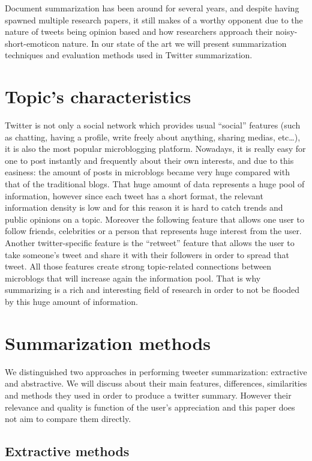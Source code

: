 \documentclass[runningheads]{llncs}
\begin{document}
Document summarization has been around for several years, and despite having
spawned multiple research papers, it still makes of a worthy opponent due to
the nature of tweets being opinion based and how researchers approach their
noisy-short-emoticon nature. In our state of the art we will present
summarization techniques and evaluation methods used in Twitter summarization.

\section{Topic's characteristics}

Twitter is not only a social network which provides usual ``social'' features
(such as chatting, having a profile, write freely about anything, sharing
medias, etc…), it is also the most popular microblogging platform. Nowadays, it is
really easy for one to post instantly and frequently about their own interests,
and due to this easiness: the amount of posts in microblogs became very huge
compared with that of the traditional blogs. That huge amount of data
represents a huge pool of information, however since each tweet has a short
format, the relevant information density is low and for this reason it is hard
to catch trends and public opinions on a topic. Moreover the following feature
that allows one user to follow friends, celebrities or a person that represents
huge interest from the user. Another twitter-specific feature is the
``retweet'' feature that allows the user to take someone's tweet and share it
with their followers in order to spread that tweet. All those features create
strong topic-related connections between microblogs that will increase again
the information pool. That is why summarizing is a rich and interesting field
of research in order to not be flooded by this huge amount of information.

\section{Summarization methods}

We distinguished two approaches in performing tweeter summarization: extractive
and abstractive. We will discuss about their main features, differences,
similarities and methods they used in order to produce a twitter summary.
However their relevance and quality is function of the user's appreciation and
this paper does not aim to compare them directly.

\subsection{Extractive methods}
\end{document}
